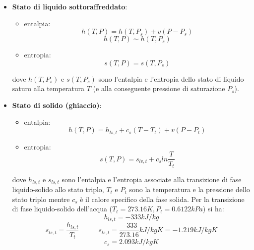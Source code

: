 \begin{itemize}
    \item \textbf{Stato di liquido sottoraffreddato}:
    \begin{itemize}
        \item entalpia: \[
            h(T,P) = h(T,P_s) + v (P-P_s)
        \]
        \[
            h(T,P) \sim h(T,P_s)
        \]
        \item entropia: \[
            s(T,P) = s(T,P_s)
        \]
    \end{itemize}
    dove $h(T,P_s)$ e $s(T,P_s)$ sono l'entalpia e l'entropia dello stato di liquido saturo alla temperatura $T$ (e alla conseguente pressione di saturazione $P_s$).
    \item \textbf{Stato di solido (ghiaccio)}:
    \begin{itemize}
        \item entalpia:\[
            h(T,P) = h_{ls,t} + c_s(T-T_t) + v(P-P_t)
        \]
        \item entropia:\[
            s(T,P) = s_{lv,t} +c_s ln \frac{T}{T_t}
        \]
    \end{itemize}
    dove $h_{ls,t}$ e $s_{ls,t}$ sono l'entalpia e l'entropia associate alla transizione di fase liquido-solido allo stato triplo, $T_t$ e $P_t$ sono la temperatura e la pressione dello stato triplo mentre $c_s$ è il calore specifico della fase solida.\newline
    Per la transizione di fase liquido-solido dell'acqua ($T_t = 273.16 K, P_t = 0.6122kPa$) si ha:
    \[
        h_{ls,t} = -333kJ/kg
    \]
    \[
        s_{ls,t} = \frac{h_{ls,t}}{T_t} \;\;\;\;\;\;\;\;\;\;s_{ls,t} = \frac{-333}{273.16}kJ/kgK = -1.219 kJ/kgK
    \]
    \[
        c_s = 2.093 kJ/kgK
    \]
\end{itemize}